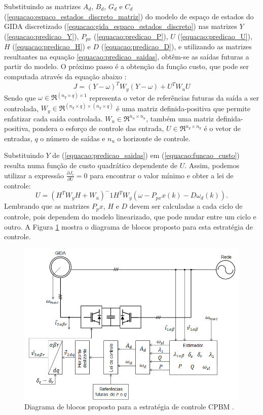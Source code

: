 	Substituindo as matrizes $A_d$, $B_d$, $G_d$ e $C_d$ (\ref{equacao:espaco_estados_discreto_matriz}) do modelo de espaço de estados do GIDA discretizado (\ref{equacao:gida_espaco_estados_discreto}) nas matrizes $Y$ (\ref{equacao:predicao_Y}), $P_{px}$ (\ref{equacao:predicao_P}), $U$ (\ref{equacao:predicao_U}), $H$ (\ref{equacao:predicao_H}) e $D$ (\ref{equacao:predicao_D}), e utilizando as matrizes resultantes na equação \ref{equacao:predicao_saidas}, obtêm-se as saídas futuras a partir do modelo. O próximo passo é a obtenção da função custo, que pode ser computada através da equação abaixo \cite{alfeucustominimizado,alfeu}:
	\begin{equation}
		\label{equacao:funcao_custo}
		J=(Y-\omega)^TW_y(Y-\omega)+U^TW_uU
	\end{equation}
	Sendo que $\omega \in \Re^{(n_y \times q) \times 1}$ representa o vetor de referências futuras da saída a ser controlada, $W_y \in \Re^{(n_y \times q)\times (n_y \times q)}$ é uma matriz definida-positiva que permite enfatizar cada saída controlada. $W_u \in \Re^{n_u \times n_u}$, também uma matriz definida-positiva, pondera o esforço de controle das entrada, $U \in \Re^{n_y \times n_y}$ é o vetor de entradas, $q$ o número de saídas e $n_u$ o horizonte de controle.
	
	Substituindo $Y$ de (\ref{equacao:predicao_saidas}) em (\ref{equacao:funcao_custo}) resulta numa função de custo quadrático dependente de $U$. Assim, podemos utilizar a expressão $\frac{\partial J_c}{\partial U} = 0$ para encontrar o valor mínimo e obter a lei de controle:
	\begin{equation}
		\label{equacao:lei_controle}
		U=(H^TW_yH+W_u)^-1H^TW_y(\omega - P_{px}x(k)-D\omega_d(k)).
	\end{equation}
	Lembrando que as matrizes $P_px$, $H$ e $D$ devem ser calculadas a cada ciclo de controle, pois dependem do modelo linearizado, que pode mudar entre um ciclo e outro. A Figura \ref{figura:gida_preditivo_esquema} mostra o diagrama de blocos proposto para esta estratégia de controle.
	\begin{figure}[ht]
		\centering
		\includegraphics[width=1\textwidth]{Figuras/gida_esquematico_preditivo.png}
		\caption{Diagrama de blocos proposto para a estratégia de controle CPBM \cite{paperalfeu}.}
		\label{figura:gida_preditivo_esquema}
	\end{figure}

